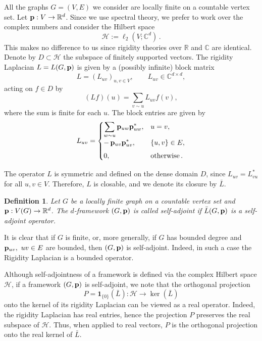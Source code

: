 \documentclass[10pt,a4paper]{amsart}
\numberwithin{equation}{section}
\newtheorem{definition}[theorem]{Definition}
\newcommand{\R}{\mathbb R}
\newcommand{\C}{\mathbb C}
\newcommand{\cH}{\mathcal H}
\newcommand{\p}{{\bf p}}
\begin{document}
All the graphs $G=(V,E)$ we consider
are locally finite on a countable vertex set. Let $\p:V\to\R^d$. Since we use spectral theory, we prefer to work over the complex numbers and consider the Hilbert space
\[
\cH:=\ell_2(V;\C^d)\,.
\]
This makes no difference to us since rigidity theories over $\R$ and $\C$ are identical. Denote by $D\subset\cH$ the subspace of finitely supported vectors. The rigidity Laplacian $L=L(G,\p)$ is given by a (possibly infinite) block matrix
\[
L=(L_{uv})_{u,v\in V}, \qquad 
L_{uv}\in\C^{d\times d},
\]
acting on $f\in D$ by
\[
(L f)(u)=\sum_{v\sim u}L_{uv} f(v),
\]
where the sum is finite for each $u$. The block entries are given by
\begin{equation}\label{eq:Luv}
L_{uv}=
\begin{cases}
\displaystyle \sum_{w\sim u} \p_{uw}\p_{uw}^{*}, & u=v,\\[1ex]
\displaystyle -\,\p_{uv}\p_{uv}^{*}, & \{u,v\}\in E,\\[1ex]
0, & \text{otherwise}\,.
\end{cases}
\end{equation}


The operator $L$ is symmetric and defined on the dense domain $D$, since $L_{uv}=L_{vu}^*$ for all $u,v\in V$. Therefore, $L$ is closable, and we denote its closure by $\bar L$.

\begin{definition}
Let $G$ be a locally finite graph on a countable vertex set and $\p:V(G)\to\R^d$.
The $d$-framework $(G,\p)$ is called \emph{self-adjoint} if $\bar L(G,\p)$ is a self-adjoint operator.
\end{definition}
It is clear that if $G$ is finite, or, more generally, if $G$ has bounded degree and $\p_{uv},~uv\in E$ are bounded, then $(G,\p)$ is self-adjoint. Indeed, in such a case the Rigidity Laplacian is a bounded operator.

Although self-adjointness of a framework is defined via the complex Hilbert
space \(\cH\), if a framework \((G,\p)\) is self-adjoint, we note that the
orthogonal projection
\[
  P=\mathbf 1_{\{0\}}(\bar L):\cH\to \ker(\bar L)
\]
onto the kernel of its rigidity Laplacian can be viewed as a real operator. Indeed, the
rigidity Laplacian has real entries, hence the projection \(P\) preserves the real subspace of $\cH$.
Thus, when applied to real vectors, \(P\) is the orthogonal projection onto
the real kernel of \(\bar L\). 
\end{document}
